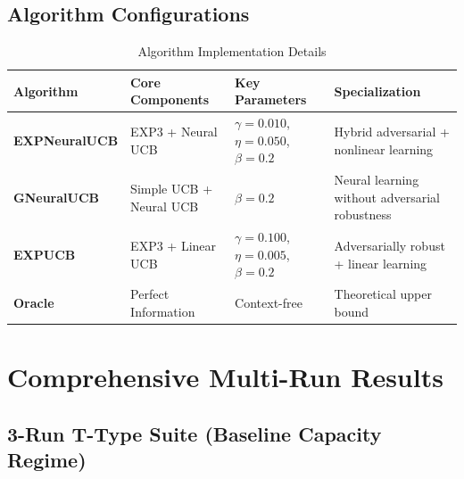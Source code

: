 \documentclass[11pt,a4paper]{article}
\begin{document}
\subsection{Algorithm Configurations}

\begin{table}[H]
\small
\centering
\caption{Algorithm Implementation Details}
\begin{tabular}{|l|p{3.5cm}|p{3.5cm}|p{3.5cm}|}
\hline
\textbf{Algorithm} & \textbf{Core Components} & \textbf{Key Parameters} & \textbf{Specialization} \\
\hline
\hline
\textbf{EXPNeuralUCB} & EXP3 + Neural UCB & \(\gamma=0.010\), \(\eta=0.050\), \(\beta=0.2\) & Hybrid adversarial + nonlinear learning \\
\hline
\textbf{GNeuralUCB} & Simple UCB + Neural UCB & \(\beta=0.2\) & Neural learning without adversarial robustness \\
\hline
\textbf{EXPUCB} & EXP3 + Linear UCB & \(\gamma=0.100\), \(\eta=0.005\), \(\beta=0.2\) & Adversarially robust + linear learning \\
\hline
\textbf{Oracle} & Perfect Information & Context-free & Theoretical upper bound \\
\hline
\end{tabular}
\end{table}

\section{Comprehensive Multi-Run Results}

\subsection{3-Run T-Type Suite (Baseline Capacity Regime)}
\end{document}
